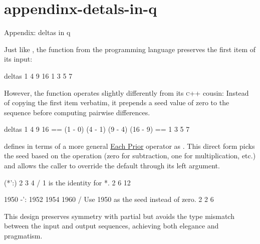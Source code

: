 \documentclass{article}
\begin{document}
\section{appendinx-detals-in-q}{Appendix: deltas in q}

Just like ,
the \href{https://code.kx.com/q/ref/deltas/}{} function from the \href{https://code.kx.com/q/learn/startingkdb/language/}{} programming language preserves the first item of its input:

\begin{code}[q]
deltas 1 4 9 16
1 3 5 7
\end{code}

However, the  function operates slightly differently from its \textsc{c++} cousin:
Instead of copying the first item verbatim,
it prepends a seed value of zero to the sequence before computing pairwise differences.

\begin{code}
deltas 1 4 9 16 == (1 - 0) (4 - 1) (9 - 4) (16 - 9) == 1 3 5 7
\end{code}

 defines  in terms of a more general \href{https://code.kx.com/q/ref/maps/#each-prior}{Each Prior} operator as .
This direct form picks the seed based on the operation (zero for subtraction, one for multiplication, etc.)
and allows the caller to override the default through its left argument.

\begin{code}[q]
(*':) 2 3 4  / 1 is the identity for *.
2 6 12

1950 -': 1952 1954 1960 / Use 1950 as the seed instead of zero.
2 2 6
\end{code}

This design preserves symmetry with partial \href{https://code.kx.com/q/ref/sum/#sums}{}
but avoids the type mismatch between the input and output sequences, achieving both elegance and pragmatism.
\end{document}
